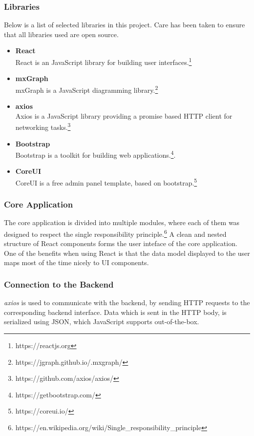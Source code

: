 \documentclass[a4paper,12pt,pdftex,halfparskip,cleardoubleempty,bibtotoc,liststotoc]{scrbook}
\begin{document}
\subsubsection{Libraries}
Below is a list of selected libraries in this project. Care has been taken to ensure that all libraries used are open source.
\begin{itemize}
\item \textbf{React}\\
React is an JavaScript library for building user interfaces.\footnote{https://reactjs.org}
\item \textbf{mxGraph}\\
mxGraph is a JavaScript diagramming library.\footnote{https://jgraph.github.io/.mxgraph/}
\item \textbf{axios}\\
Axios is a JavaScript library providing a promise based HTTP client for networking tasks.\footnote{https://github.com/axios/axios/}
\item \textbf{Bootstrap}\\
Bootstrap is a toolkit for building web applications.\footnote{https://getbootstrap.com/}.
\item \textbf{CoreUI}\\
CoreUI is a free admin panel template, based on bootstrap.\footnote{https://coreui.io/}
\end{itemize}

\subsubsection{Core Application}

The core application is divided into multiple modules, where each of them was designed to respect the single responsibility principle.\footnote{https://en.wikipedia.org/wiki/Single\_responsibility\_principle} A clean and nested structure of React components forms the user inteface of the core  application. One of the benefits when using React is that the data model displayed to the user maps most of the time nicely to UI components.

\subsubsection{Connection to the Backend}

\textit{axios} is used to communicate with the backend, by sending HTTP requests to the corresponding backend interface. Data which is sent in the HTTP body, is serialized using JSON, which JavaScript supports out-of-the-box.
\end{document}
